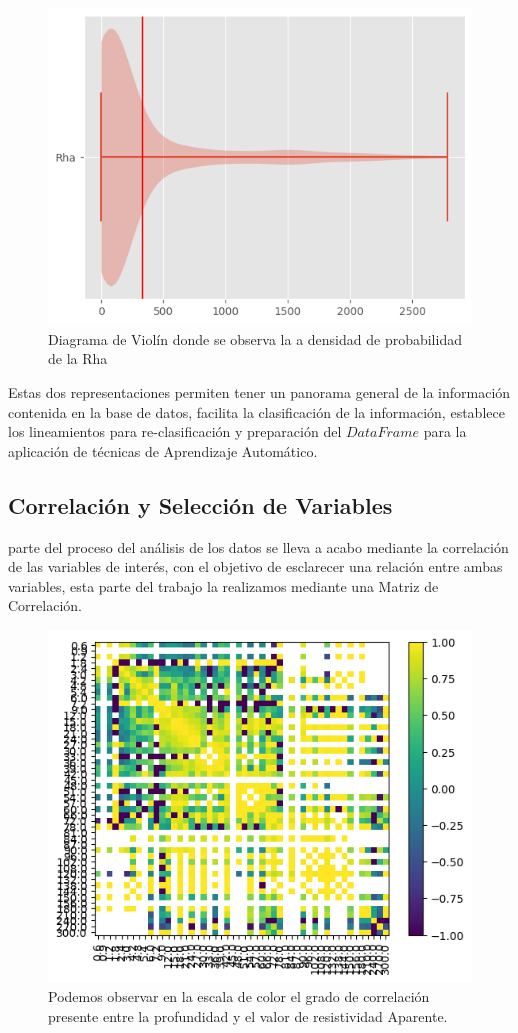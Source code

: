 \documentclass[sn-mathphys,Numbered]{sn-jnl}%
\theoremstyle{thmstyleone}%
\theoremstyle{thmstyletwo}%
\theoremstyle{thmstylethree}%
\begin{document}
\begin{figure}[H]
	\centering
	\includegraphics[width=0.7\linewidth]{imagenes/diagrama de violin distribucion de resissitivdades aparentes}
	\caption[Figura]{Diagrama de Violín donde se observa la a densidad de probabilidad de la Rha}
	\label{fig:diagrama de violin}
\end{figure}

Estas dos representaciones permiten tener un panorama general de la información contenida en la base de datos, facilita la clasificación de la información, establece los lineamientos para re-clasificación y preparación del $DataFrame$ para la aplicación de técnicas de Aprendizaje Automático.

\subsection{Correlación y Selección de Variables}\label{subsec5}

parte del proceso del análisis de los datos se lleva a acabo mediante la correlación  de las variables de interés, con el objetivo de esclarecer una relación entre ambas variables, esta parte del trabajo la realizamos mediante una Matriz de Correlación. 

\begin{figure}[H]
	\centering
	\includegraphics[width=0.7\linewidth]{imagenes/matriz de correlacion}
	\caption[Figura]{Podemos observar en la escala de color el grado de correlación presente entre la profundidad y el valor de resistividad Aparente.}
	\label{fig:Matrix de correlacion}
\end{figure}
\end{document}

